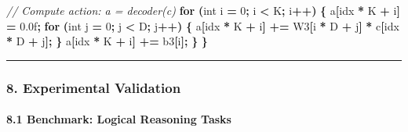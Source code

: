 \documentclass[
  11pt,
  a4paper,
]{article}
\newenvironment{Shaded}{\begin{snugshade}}{\end{snugshade}}
\newcommand{\BuiltInTok}[1]{#1}
\newcommand{\CommentTok}[1]{\textcolor[rgb]{0.56,0.35,0.01}{\textit{#1}}}
\newcommand{\ControlFlowTok}[1]{\textcolor[rgb]{0.13,0.29,0.53}{\textbf{#1}}}
\newcommand{\DataTypeTok}[1]{\textcolor[rgb]{0.13,0.29,0.53}{#1}}
\newcommand{\DecValTok}[1]{\textcolor[rgb]{0.00,0.00,0.81}{#1}}
\newcommand{\FloatTok}[1]{\textcolor[rgb]{0.00,0.00,0.81}{#1}}
\newcommand{\NormalTok}[1]{#1}
\newcommand{\OperatorTok}[1]{\textcolor[rgb]{0.81,0.36,0.00}{\textbf{#1}}}
\begin{document}
\begin{Shaded}
\begin{Highlighting}[]
    \CommentTok{// Compute action: a = decoder(c)}
    \ControlFlowTok{for} \OperatorTok{(}\DataTypeTok{int}\NormalTok{ i }\OperatorTok{=} \DecValTok{0}\OperatorTok{;}\NormalTok{ i }\OperatorTok{\textless{}}\NormalTok{ K}\OperatorTok{;}\NormalTok{ i}\OperatorTok{++)} \OperatorTok{\{}
\NormalTok{        a}\OperatorTok{[}\NormalTok{idx }\OperatorTok{*}\NormalTok{ K }\OperatorTok{+}\NormalTok{ i}\OperatorTok{]} \OperatorTok{=} \FloatTok{0.0}\BuiltInTok{f}\OperatorTok{;}
        \ControlFlowTok{for} \OperatorTok{(}\DataTypeTok{int}\NormalTok{ j }\OperatorTok{=} \DecValTok{0}\OperatorTok{;}\NormalTok{ j }\OperatorTok{\textless{}}\NormalTok{ D}\OperatorTok{;}\NormalTok{ j}\OperatorTok{++)} \OperatorTok{\{}
\NormalTok{            a}\OperatorTok{[}\NormalTok{idx }\OperatorTok{*}\NormalTok{ K }\OperatorTok{+}\NormalTok{ i}\OperatorTok{]} \OperatorTok{+=}\NormalTok{ W3}\OperatorTok{[}\NormalTok{i }\OperatorTok{*}\NormalTok{ D }\OperatorTok{+}\NormalTok{ j}\OperatorTok{]} \OperatorTok{*}\NormalTok{ c}\OperatorTok{[}\NormalTok{idx }\OperatorTok{*}\NormalTok{ D }\OperatorTok{+}\NormalTok{ j}\OperatorTok{];}
        \OperatorTok{\}}
\NormalTok{        a}\OperatorTok{[}\NormalTok{idx }\OperatorTok{*}\NormalTok{ K }\OperatorTok{+}\NormalTok{ i}\OperatorTok{]} \OperatorTok{+=}\NormalTok{ b3}\OperatorTok{[}\NormalTok{i}\OperatorTok{];}
    \OperatorTok{\}}
\OperatorTok{\}}
\end{Highlighting}
\end{Shaded}

\begin{center}\rule{0.5\linewidth}{0.5pt}\end{center}

\subsubsection{8. Experimental
Validation}\label{experimental-validation}

\paragraph{8.1 Benchmark: Logical Reasoning
Tasks}\label{benchmark-logical-reasoning-tasks}
\end{document}
